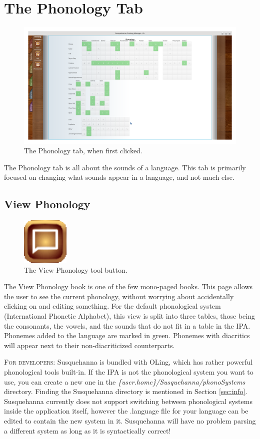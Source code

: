 \documentclass{report}
\begin{document}
	\chapter{The Phonology Tab}
	\begin{figure}[ht]
		\centering
		\includegraphics[width=1\linewidth]{img/phonology-tab}
		\caption{The Phonology tab, when first clicked.}
		\label{fig:phonology-tab}
	\end{figure}
	The Phonology tab is all about the sounds of a language. This tab is primarily focused on changing what sounds appear in a language, and not much else.
	\newpage
	\section{View Phonology}
	\begin{figure}
		\centering
		\includegraphics[width=0.2\textwidth]{img/view-phonology}
		\caption{The View Phonology tool button.}
		\label{fig:view-phonology}
	\end{figure}
	The View Phonology book is one of the few mono-paged books. This page allows the user to see the current phonology, without worrying about accidentally clicking on and editing something. For the default phonological system (International Phonetic Alphabet), this view is split into three tables, those being the consonants, the vowels, and the sounds that do not fit in a table in the IPA. Phonemes added to the language are marked in green. Phonemes with diacritics will appear next to their non-diacriticized counterparts.
	\begin{tcolorbox}[width=1\textwidth]
		\textsc{For developers:} Susquehanna is bundled with OLing, which has rather powerful phonological tools built-in. If the IPA is not the phonological system you want to use, you can create a new one in the \emph{\{user.home\}/Susquehanna/phonoSystems} directory. Finding the Susquehanna directory is mentioned in Section \ref{sec:info}. Susquehanna currently does not support switching between phonological systems inside the application itself, however the .language file for your language can be edited to contain the new system in it. Susquehanna will have no problem parsing a different system as long as it is syntactically correct!
	\end{tcolorbox}
\end{document}
